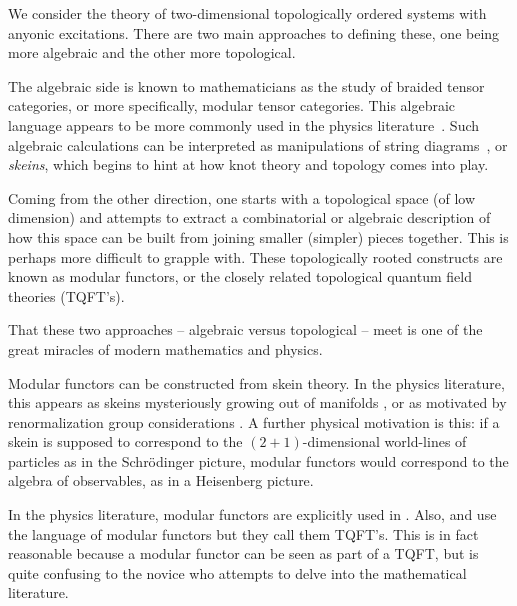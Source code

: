 \documentclass[aps, prl, letterpaper, twocolumn, superscriptaddress, notitlepage, 10pt]{revtex4-1}
\begin{document}
%
%

We consider the theory of two-dimensional topologically ordered systems
with anyonic excitations.
There are two main approaches to defining these,
one being more algebraic and the other more topological.

The algebraic side is known to mathematicians as the study of braided
tensor categories, or more specifically, modular tensor categories.
This algebraic language appears to be more commonly used 
in the physics literature~\cite{Kitaev2006}.
Such algebraic calculations can be interpreted as
manipulations of string diagrams~\cite{Baez2010},
or \emph{skeins}, which begins to hint at
how knot theory and topology comes into play.

Coming from the other direction, one starts with
a topological space (of low dimension) and attempts
to extract a combinatorial or algebraic description of how this
space can be built from joining smaller (simpler) pieces together.
This is perhaps more difficult to grapple with.
These topologically rooted constructs are known as modular functors, 
or the closely related topological quantum field theories (TQFT's).

That these two approaches -- algebraic versus topological -- meet is one of the great
miracles of modern mathematics and physics.


Modular functors can be constructed from skein theory.
In the physics literature, 
this appears as skeins mysteriously growing out of manifolds \cite{Pfeifer2012},
or as motivated by renormalization group considerations \cite{Levin2005}.
A further physical motivation is this: if a skein 
is supposed to correspond to the $(2+1)$-dimensional
world-lines of particles
as in the Schr\"{o}dinger picture,
modular functors would
correspond to the algebra of observables, as in
a Heisenberg picture.

In the physics literature, modular functors are
explicitly used in \cite{Freedman2002, Freedman2002simulation}.
Also, \cite{Beverland2014} and \cite{Kitaev2006topo}
use the language of modular functors but they call them TQFT's.
This is in fact reasonable because a modular functor can be
seen as part of a TQFT, but is quite confusing to the
novice who attempts to delve into the mathematical literature.
\end{document}

